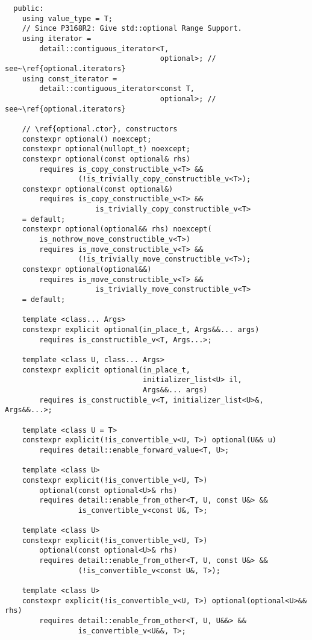 \documentclass[a4paper,10pt,oneside,openany,final,article]{memoir}
\begin{document}
\begin{verbatim}
  public:
    using value_type = T;
    // Since P3168R2: Give std::optional Range Support.
    using iterator =
        detail::contiguous_iterator<T,
                                    optional>; // see~\ref{optional.iterators}
    using const_iterator =
        detail::contiguous_iterator<const T,
                                    optional>; // see~\ref{optional.iterators}

    // \ref{optional.ctor}, constructors
    constexpr optional() noexcept;
    constexpr optional(nullopt_t) noexcept;
    constexpr optional(const optional& rhs)
        requires is_copy_constructible_v<T> &&
                 (!is_trivially_copy_constructible_v<T>);
    constexpr optional(const optional&)
        requires is_copy_constructible_v<T> &&
                     is_trivially_copy_constructible_v<T>
    = default;
    constexpr optional(optional&& rhs) noexcept(
        is_nothrow_move_constructible_v<T>)
        requires is_move_constructible_v<T> &&
                 (!is_trivially_move_constructible_v<T>);
    constexpr optional(optional&&)
        requires is_move_constructible_v<T> &&
                     is_trivially_move_constructible_v<T>
    = default;

    template <class... Args>
    constexpr explicit optional(in_place_t, Args&&... args)
        requires is_constructible_v<T, Args...>;

    template <class U, class... Args>
    constexpr explicit optional(in_place_t,
                                initializer_list<U> il,
                                Args&&... args)
        requires is_constructible_v<T, initializer_list<U>&, Args&&...>;

    template <class U = T>
    constexpr explicit(!is_convertible_v<U, T>) optional(U&& u)
        requires detail::enable_forward_value<T, U>;

    template <class U>
    constexpr explicit(!is_convertible_v<U, T>)
        optional(const optional<U>& rhs)
        requires detail::enable_from_other<T, U, const U&> &&
                 is_convertible_v<const U&, T>;

    template <class U>
    constexpr explicit(!is_convertible_v<U, T>)
        optional(const optional<U>& rhs)
        requires detail::enable_from_other<T, U, const U&> &&
                 (!is_convertible_v<const U&, T>);

    template <class U>
    constexpr explicit(!is_convertible_v<U, T>) optional(optional<U>&& rhs)
        requires detail::enable_from_other<T, U, U&&> &&
                 is_convertible_v<U&&, T>;


\end{verbatim}
\end{document}
